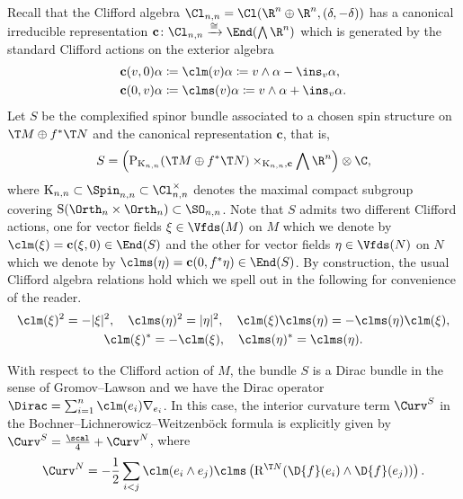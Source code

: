 \documentclass[a4paper,11pt]{amsart}
\numberwithin{equation}{section}
\begin{document}
Recall that the Clifford algebra \(\Cl_{n,n} = \Cl(\R^n \oplus \R^n, (\delta, -\delta))\) has a canonical irreducible representation \(\mathbf{c} \colon \Cl_{n,n} \xrightarrow{\cong} \End(\bigwedge \R^n)\) which is generated by the standard Clifford actions on the exterior algebra
\begin{align}
    \textbf{c}(v,0) \alpha &\coloneqq \clm(v) \alpha \coloneqq v \wedge \alpha - \ins_v \alpha, \label{eq:differential_forms_clifford}\\
    \textbf{c}(0,v) \alpha &\coloneqq \clms(v) \alpha \coloneqq v \wedge \alpha + \ins_v \alpha.\nonumber
\end{align}
Let \(S\) be the complexified spinor bundle associated to a chosen spin structure on \(\T M \oplus f^\ast \T N\) and the canonical representation \(\textbf{c}\), that is, 
\[S = \left(\mathrm{P}_{\mathrm{K}_{n,n}}(\T M \oplus f^\ast \T N) \times_{\mathrm{K}_{n,n},\textbf{c}} \bigwedge  \R^n \right) \otimes \C,\]
where \(\mathrm{K}_{n,n} \subset \Spin_{n,n} \subset \Cl_{n,n}^\times\) denotes the maximal compact subgroup covering \(\mathrm{S}(\Orth_n \times \Orth_n) \subset \SO_{n,n}\).
Note that \(S\) admits two different Clifford actions, one for vector fields \(\xi \in \Vfds(M)\) on \(M\) which we denote by \(\clm(\xi) = \textbf{c}(\xi, 0) \in \End(S)\) and the other for vector fields \(\eta \in \Vfds(N)\) on \(N\) which we denote by \(\clms(\eta) = \textbf{c}(0, f^\ast \eta) \in \End(S)\).
By construction, the usual Clifford algebra relations hold which we spell out in the following for convenience of the reader.
\begin{gather*}
    \clm(\xi)^2 = - |\xi|^2, \quad \clms(\eta)^2 = |\eta|^2, \quad \clm(\xi) \clms(\eta) = -\clms(\eta) \clm(\xi),\\
    \clm(\xi)^\ast = -\clm(\xi), \quad \clms(\eta)^\ast = \clms(\eta).
\end{gather*}

With respect to the Clifford action of \(M\), the bundle \(S\) is a Dirac bundle in the sense of Gromov--Lawson and we have the Dirac operator \(\Dirac = \sum_{i=1}^n \clm(e_i) \nabla_{e_i}\).
In this case, the interior curvature term \(\Curv^S\) in the Bochner--Lichnerowicz--Weitzenböck formula  is explicitly given by \(\Curv^S = \frac{\scal}{4} + \Curv^N\), where
\begin{equation}
    \Curv^N = -\frac{1}{2}\sum_{i < j} \clm(e_i \wedge e_j) \clms\left(\mathrm{R}^{\T N}(\D{f}(e_i) \wedge \D{f}(e_j))\right). \label{eq:twisting_curvature}
\end{equation}
\end{document}
